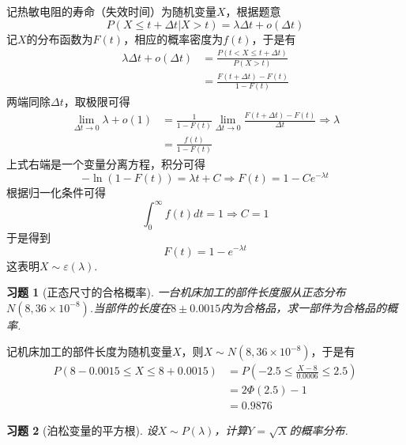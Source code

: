 \documentclass[12pt,fontset=fandol]{ctexart}
\newtheorem{exercise}{习题}[section]
\begin{document}
\begin{solve}\label{a:Y3.14}
记热敏电阻的寿命（失效时间）为随机变量$X$，根据题意
\[P(X \leqslant t + \Delta t|X > t) = \lambda \Delta t + o(\Delta t)\]
记$X$的分布函数为$F(t)$，相应的概率密度为$f(t)$，于是有
\[\begin{aligned}\lambda \Delta t + o(\Delta t) &= \frac{{P(t < X \leqslant t + \Delta t)}}{{P(X > t)}} \\&= \frac{{F(t + \Delta t) - F(t)}}{{1 - F(t)}}\end{aligned}\]
两端同除$\Delta t$，取极限可得
\[\begin{aligned}\mathop {\lim }\limits_{\Delta t \to 0} \lambda  + o(1) &= \frac{1}{{1 - F(t)}}\mathop {\lim }\limits_{\Delta t \to 0} \frac{{F(t + \Delta t) - F(t)}}{{\Delta t}} \Rightarrow \lambda  \\&= \frac{{f(t)}}{{1 - F(t)}}\end{aligned}\]
上式右端是一个变量分离方程，积分可得
\[ - \ln (1 - F(t)) = \lambda t + C \Rightarrow F(t) = 1 - C{e^{ - \lambda t}}\]
根据归一化条件可得
\[\int_0^\infty  {f(t)dt}  = 1 \Rightarrow C = 1\]
于是得到
\[F(t) = 1 - {e^{ - \lambda t}}\]
这表明$X\sim \varepsilon(\lambda)$.
\end{solve}

\begin{exercise}[正态尺寸的合格概率]\label{q:Y3.15}
一台机床加工的部件长度服从正态分布$N(8,36\times 10^{-8})$.当部件的长度在$8\pm 0.0015$内为合格品，求一部件为合格品的概率.\par{}
\end{exercise}

\begin{solve}\label{a:Y3.15}
记机床加工的部件长度为随机变量$X$，则$X\sim N(8,36\times 10^{-8})$，于是有
\[\begin{aligned}P(8 - 0.0015 \leqslant X \leqslant 8 + 0.0015) &= P( - 2.5 \leqslant \frac{{X - 8}}{{0.0006}} \leqslant 2.5) \\&= 2\Phi (2.5) - 1 \\&= 0.9876\end{aligned}\]
\end{solve}

\begin{exercise}[泊松变量的平方根]\label{q:Y3.16}
设$X\sim P(\lambda)$，计算$Y=\sqrt{X}$的概率分布.\par{}
\end{exercise}
\end{document}
